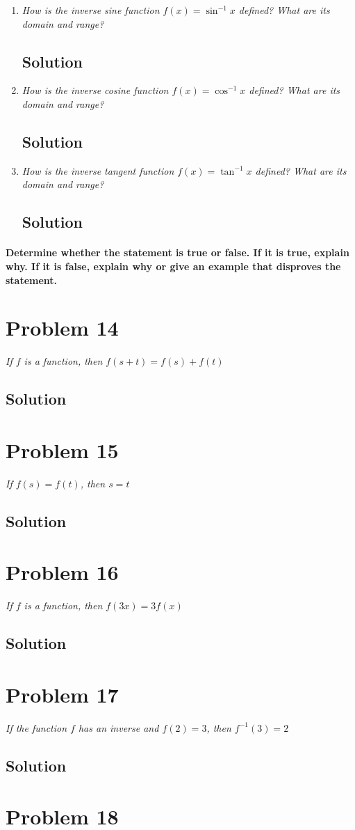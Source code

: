 \documentclass[11pt]{article}
\newcommand{\soln}{\subsection*}
\newcommand{\qn}{\textit}
\begin{document}
\begin{enumerate}
	\item \qn{How is the inverse sine function $f(x)=\sin^{-1}x$ defined? What are its domain and range?}
	\soln{Solution}
	
	\item \qn{How is the inverse cosine function $f(x)=\cos^{-1}x$ defined? What are its domain and range?}
	\soln{Solution}
	
	\item \qn{How is the inverse tangent function $f(x)=\tan^{-1}x$ defined? What are its domain and range?}
	\soln{Solution}
\end{enumerate}

\paragraph{Determine whether the statement is true or false. If it is true, explain why. If it is false, explain why or give an example that disproves the statement.}

\section*{Problem 14}

\qn{If $f$ is a function, then $f(s+t)=f(s)+f(t)$}
\soln{Solution}

\section*{Problem 15}

\qn{If $f(s)=f(t)$, then $s=t$}
\soln{Solution}

\section*{Problem 16}

\qn{If $f$ is a function, then $f(3x)=3f(x)$}
\soln{Solution}

\section*{Problem 17}

\qn{If the function $f$ has an inverse and $f(2)=3$, then $f^{-1}(3)=2$}
\soln{Solution}

\section*{Problem 18}
\end{document}
